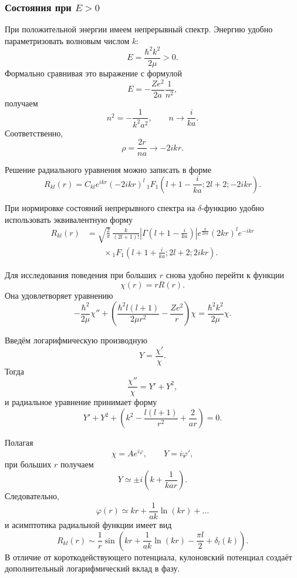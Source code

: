 \documentclass[12pt,a4paper]{article}
\begin{document}
\subsubsection{Состояния при \texorpdfstring{$E>0$}{E>0}}

При положительной энергии имеем непрерывный спектр. Энергию удобно
параметризовать волновым числом $k$:
\[
    \boxed{
        E=\frac{\hbar^2k^2}{2\mu}>0
    }.
\]
Формально сравнивая это выражение с формулой
\[
    E
    =
    -\frac{Ze^2}{2a}\frac{1}{n^2},
\]
получаем
\[
    n^2=-\frac{1}{k^2a^2},
    \qquad
    n\longrightarrow\frac{i}{ka}.
\]
Соответственно,
\[
    \rho
    =
    \frac{2r}{na}
    \longrightarrow
    -2ikr.
\]

Решение радиального уравнения можно записать в форме
\[
    \boxed{
    R_{kl}(r)
    =
    C_{kl}
    e^{ikr}
    (-2ikr)^l\,
    {}_1F_1
    \left(
        l+1-\frac{i}{ka};
        2l+2;
        -2ikr
    \right)
    }.
\]

При нормировке состояний непрерывного спектра на $\delta$-функцию
удобно использовать эквивалентную форму
\[
\boxed{
\begin{aligned}
    R_{kl}(r)
    &=
    \sqrt{\frac{2}{\pi}}\,
    \frac{k}{(2l+1)!}
    \left|
        \Gamma
        \left(
            l+1-\frac{i}{ka}
        \right)
    \right|
    e^{\frac{\pi}{2ka}}
    (2kr)^l e^{-ikr}
    \\
    &\qquad\times
    {}_1F_1
    \left(
        l+1+\frac{i}{ka};
        2l+2;
        2ikr
    \right).
\end{aligned}
}
\]

Для исследования поведения при больших $r$ снова удобно перейти к
функции
\[
    \chi(r)=rR(r).
\]
Она удовлетворяет уравнению
\[
    -\frac{\hbar^2}{2\mu}\chi''
    +
    \left(
        \frac{\hbar^2l(l+1)}{2\mu r^2}
        -
        \frac{Ze^2}{r}
    \right)\chi
    =
    \frac{\hbar^2k^2}{2\mu}\chi.
\]

Введём логарифмическую производную
\[
    Y=\frac{\chi'}{\chi}.
\]
Тогда
\[
    \frac{\chi''}{\chi}=Y'+Y^2,
\]
и радиальное уравнение принимает форму
\[
    \boxed{
    Y'+Y^2
    +
    \left(
        k^2
        -
        \frac{l(l+1)}{r^2}
        +
        \frac{2}{ar}
    \right)
    =
    0
    }.
\]

Полагая
\[
    \chi=Ae^{i\varphi},
    \qquad
    Y=i\varphi',
\]
при больших $r$ получаем
\[
    Y
    \simeq
    \pm i
    \left(
        k+\frac{1}{kar}
    \right).
\]
Следовательно,
\[
    \varphi(r)
    \simeq
    kr+\frac{1}{ak}\ln(kr)+\ldots
\]
и асимптотика радиальной функции имеет вид
\[
    \boxed{
    R_{kl}(r)
    \sim
    \frac{1}{r}
    \sin
    \left(
        kr
        +
        \frac{1}{ak}\ln(kr)
        -
        \frac{\pi l}{2}
        +
        \delta_l(k)
    \right)
    }.
\]
В отличие от короткодействующего потенциала, кулоновский потенциал
создаёт дополнительный логарифмический вклад в фазу.
\end{document}
